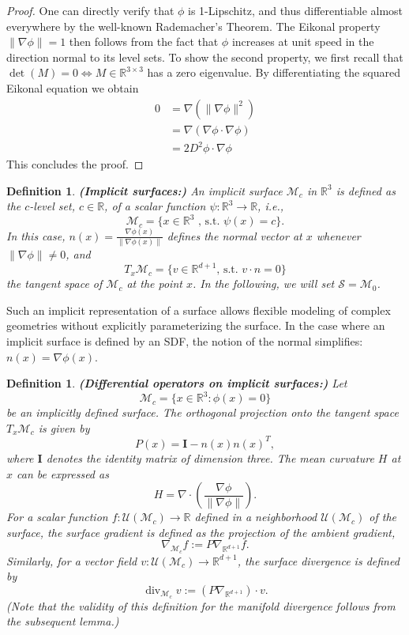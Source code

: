 \documentclass[12pt,openany]{book}
\newcommand{\R}{\mathbb{R}}
\def\S{\mathcal{S}}
\theoremstyle{plainnormal}
\newtheorem{definition}[theorem]{Definition}
\theoremstyle{remark}
\begin{document}
\begin{proof}
    One can directly verify that \( \phi \) is 1-Lipschitz, and thus differentiable almost everywhere by the well-known Rademacher's Theorem. The Eikonal property \( \|\nabla \phi\| = 1 \) then follows from the fact that \( \phi \) increases at unit speed in the direction normal to its level sets. To show the second property, we first recall that {$\det(M) = 0 \Leftrightarrow M\in\R^{3\times3}$} has a zero eigenvalue. By differentiating the squared Eikonal equation we obtain
    \begin{align*}
        0 &= \nabla(\|\nabla \phi\|^2)\\
        &= \nabla ( \nabla \phi \cdot \nabla\phi)\\
        &= 2 D^2 \phi \cdot \nabla\phi
    \end{align*} 
    This concludes the proof.
\end{proof}
\begin{definition}\textbf{(Implicit surfaces:)}
    An \emph{implicit surface} $\mathcal{M}_c$ in $\R^3$ is defined as the $c$-level set, $c\in \R$, of a scalar function $\psi: \R^3\rightarrow\R$, i.e.,
$$\mathcal M_c=\{x\in\R^3 \text{ , s.t. } \psi(x)=c\}.$$
    In this case, $n(x) = \frac{\nabla \phi(x)}{\|\nabla \phi(x)\|}$ defines the normal vector at $x$ whenever $\|\nabla \phi\| \ne 0$, and $$T_x\mathcal{M}_c = \{v\in \R^{d+1} \text{, s.t. } v\cdot n = 0\}$$ the tangent space of $\mathcal{M}_c$ at the point $x$. In the following, we will set $\S = \mathcal{M}_0$.
\end{definition}
Such an implicit representation of a surface allows flexible modeling of complex geometries without explicitly parameterizing the surface. In the case where an implicit surface is defined by an SDF, the notion of the normal simplifies: $n(x) = {\nabla \phi(x)}$.  
\begin{definition}\label{def:diff_ops_implicit_surface}\textbf{(Differential operators on implicit surfaces:)} Let $$\mathcal{M}_c = \{ x \in \mathbb{R}^{3} : \phi(x) = 0 \}$$ be an implicitly defined surface. 
The \emph{orthogonal projection} onto the tangent space \(T_x \mathcal{M}_c\) is given by
\[
P(x) = \mathbf I - n(x) n(x)^T,
\]
where \(\mathbf I\) denotes the identity matrix of dimension three.
The \emph{mean curvature} \(H\) at \(x\) can be expressed as
\[
H =  \nabla \cdot \left( \frac{\nabla \phi}{\|\nabla \phi\|} \right).
\]
For a scalar function \(f : \mathcal{U}(\mathcal{M}_c) \to \mathbb{R}\) defined in a neighborhood \(\mathcal{U}(\mathcal{M}_c)\) of the surface, the \emph{surface gradient} is defined as the projection of the ambient gradient,
\[
\nabla_{\mathcal{M}_c} f := P \nabla_{\mathbb{R}^{d+1}} f.
\]
Similarly, for a vector field \(v : \mathcal{U}(\mathcal{M}_c) \to \mathbb{R}^{d+1}\), the \emph{surface divergence} is defined by
\[
\operatorname{div}_{\mathcal{M}_c} v :=  (P \nabla_{\mathbb{R}^{d+1}}) \cdot v.
\]
(Note that the validity of this definition for the manifold divergence follows from the subsequent lemma.)
\end{definition}
\end{document}
